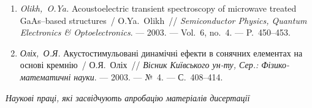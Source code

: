 \begin{enumerate}[label=\arabic*.,leftmargin=1cm,itemindent=0cm]
\item
\emph{Olikh,~O.Ya.} Acoustoelectric transient spectroscopy of microwave
  treated {G}a{A}s--based structures~/ O.Ya.~Olikh~// \emph{Semiconductor
  Physics, Quantum Electronics \& Optoelectronics}. ---
  2003. ---
  Vol.~6, no.~4. ---
  P.~450--453.

\item
\emph{Оліх,~О.Я.} Акустостимульовані
  динамічні ефекти в сонячних елементах на
  основі кремнію~/ О.Я.~Оліх~// \emph{Вісник
  Київського ун-ту, Сер.: Фізико-математичні
  науки}. ---
  2003. ---
  {№}~4. ---
  {С.}~408--414.
\end{enumerate}

\begin{center}%
\emph{Наукові праці, які засвідчують апробацію матеріалів дисертації}
\end{center}%
